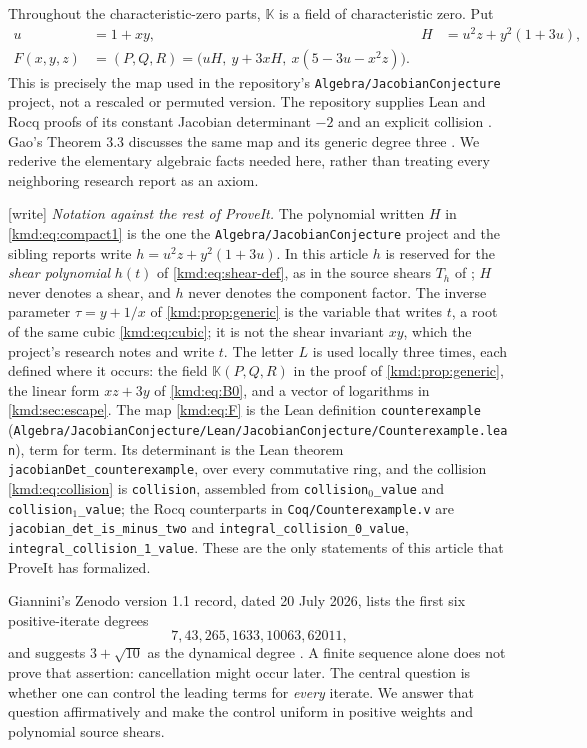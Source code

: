\documentclass[11pt,a4paper]{article}
\numberwithin{equation}{section}
\theoremstyle{definition}
\theoremstyle{remark}
\newcommand{\K}{\mathbb K}
\newcommand{\wtag}{\textup{[write]}}%
\begin{document}
Throughout the characteristic-zero parts, $\K$ is a field of
characteristic zero. Put
\begin{align}
 u&=1+xy,& H&=u^2z+y^2(1+3u),\label{kmd:eq:compact1}\\
 F(x,y,z)&=(P,Q,R)=\bigl(uH,\ y+3xH,\ x(5-3u-x^2z)\bigr).
 \label{kmd:eq:F}
\end{align}
This is precisely the map used in the repository's
\texttt{Algebra/JacobianConjecture} project, not a rescaled or permuted
version. The repository supplies Lean and Rocq proofs of its constant
Jacobian determinant $-2$ and an explicit collision \cite{repo}.
Gao's Theorem 3.3 discusses the same map and its generic degree three
\cite{gao}. We rederive the elementary algebraic facts needed here,
rather than treating every neighboring research report as an axiom.

\noindent\wtag{} \emph{Notation against the rest of ProveIt.} The
polynomial written $H$ in \eqref{kmd:eq:compact1} is the one the
\texttt{Algebra/JacobianConjecture} project and the sibling reports
\cite{weighted,arithmetic} write $h=u^2z+y^2(1+3u)$. In this article
$h$ is reserved for the \emph{shear polynomial} $h(t)$ of
\eqref{kmd:eq:shear-def}, as in the source shears $T_h$ of \cite{weighted};
$H$ never denotes a shear, and $h$ never denotes the component factor.
The inverse parameter $\tau=y+1/x$ of \cref{kmd:prop:generic} is the
variable that \cite{arithmetic} writes $t$, a root of the same cubic
\eqref{kmd:eq:cubic}; it is not the shear invariant $xy$, which the project's research notes
and \cite{weighted} write $t$. The letter $L$ is used locally three
times, each defined where it occurs: the field $\K(P,Q,R)$ in the proof
of \cref{kmd:prop:generic}, the linear form $xz+3y$ of \eqref{kmd:eq:B0}, and a
vector of logarithms in \cref{kmd:sec:escape}.
The map \eqref{kmd:eq:F} is the Lean definition \texttt{counterexample}
(\nolinkurl{Algebra/JacobianConjecture/Lean/JacobianConjecture/Counterexample.lean}),
term for term. Its determinant is the Lean theorem
\texttt{jacobianDet\_counterexample}, over every commutative ring, and
the collision \eqref{kmd:eq:collision} is \texttt{collision}, assembled from
\texttt{collision}$_0$\texttt{\_value} and
\texttt{collision}$_1$\texttt{\_value}; the Rocq counterparts in
\texttt{Coq/Counterexample.v} are \texttt{jacobian\_det\_is\_minus\_two}
and \texttt{integral\_collision\_0\_value},
\texttt{integral\_collision\_1\_value}. These are the only statements of
this article that ProveIt has formalized.

Giannini's Zenodo version 1.1 record, dated 20 July 2026, lists the
first six positive-iterate degrees
\[
7,43,265,1633,10063,62011,
\]
and suggests $3+\sqrt{10}$ as the dynamical degree \cite{giannini}. A finite sequence
alone does not prove that assertion: cancellation might occur later.
The central question is whether one can control the leading terms for
\emph{every} iterate. We answer that question affirmatively and make the
control uniform in positive weights and polynomial source shears.
\end{document}
